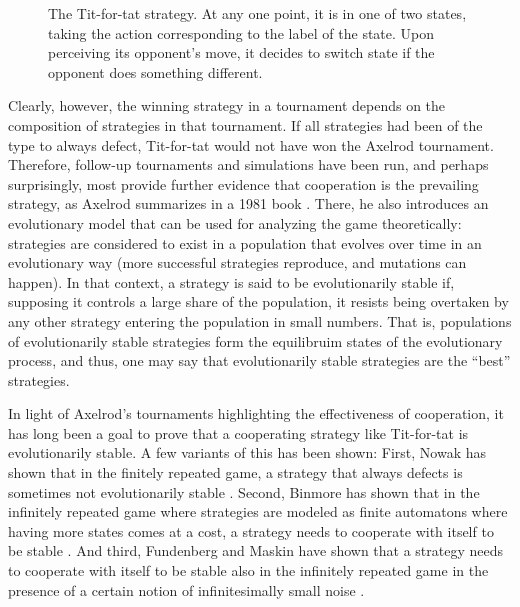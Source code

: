 \documentclass[11pt]{amsart}
\theoremstyle{definition}
\theoremstyle{remark}
\begin{document}
\begin{figure}
  \centering
  \caption{The Tit-for-tat strategy. At any one point, it is in one of two states, taking the action corresponding to the label of the state. Upon perceiving its opponent's move, it decides to switch state if the opponent does something different.}
  \label{tftfigure}
\end{figure}

Clearly, however, the winning strategy in a tournament depends on the composition of strategies in that tournament. If all strategies had been of the type to always defect, Tit-for-tat would not have won the Axelrod tournament. Therefore, follow-up tournaments and simulations have been run, and perhaps surprisingly, most provide further evidence that cooperation is the prevailing strategy, as Axelrod summarizes in a 1981 book \cite{axelrod1981evolution}. There, he also introduces an evolutionary model that can be used for analyzing the game theoretically: strategies are considered to exist in a population that evolves over time in an evolutionary way (more successful strategies reproduce, and mutations can happen). In that context, a strategy is said to be evolutionarily stable if, supposing it controls a large share of the population, it resists being overtaken by any other strategy entering the population in small numbers. That is, populations of evolutionarily stable strategies form the equilibruim states of the evolutionary process, and thus, one may say that evolutionarily stable strategies are the ``best'' strategies.

In light of Axelrod's tournaments highlighting the effectiveness of cooperation, it has long been a goal to prove that a cooperating strategy like Tit-for-tat is evolutionarily stable. A few variants of this has been shown: First, Nowak has shown that in the finitely repeated game, a strategy that always defects is sometimes not evolutionarily stable \cite{nowak2004emergence}. Second, Binmore has shown that in the infinitely repeated game where strategies are modeled as finite automatons where having more states comes at a cost, a strategy needs to cooperate with itself to be stable \cite{binmore1992evolutionary}. And third, Fundenberg and Maskin have shown that a strategy needs to cooperate with itself to be stable also in the infinitely repeated game in the presence of a certain notion of infinitesimally small noise \cite{fundenberg1990evolution}.
\end{document}
